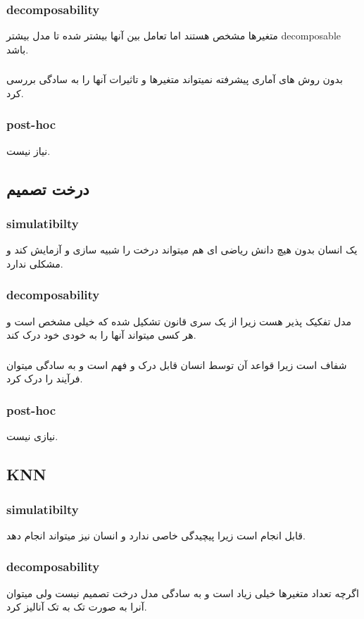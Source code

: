 \documentclass{article}[12pt]
\begin{document}
\subsubsection{decomposability}
متغیرها مشخص هستند اما تعامل بین آنها بیشتر شده تا مدل بیشتر decomposable باشد. 
\subsubsection{}
بدون روش های آماری پیشرفته نمیتواند متغیرها و تاثیرات آنها را به سادگی بررسی کرد.
\subsubsection{post-hoc}
نیاز نیست. 
\subsection{درخت تصمیم}
\subsubsection{simulatibilty}
یک انسان بدون 
هیچ دانش ریاضی ای هم میتواند درخت را شبیه سازی و آزمایش کند و مشکلی ندارد. 
\subsubsection{decomposability}
مدل تفکیک پذیر هست زیرا از یک سری قانون تشکیل شده که خیلی مشخص است و هر کسی میتواند آنها را به خودی خود درک کند.
\subsubsection{}
شفاف است زیرا قواعد آن توسط انسان قابل درک و فهم است و به سادگی میتوان فرآیند را درک کرد. 
\subsubsection{post-hoc}
نیازی نیست. 
\subsection{KNN}
\subsubsection{simulatibilty}
قابل انجام است زیرا پیچیدگی خاصی ندارد و انسان نیز میتواند انجام دهد.
\subsubsection{decomposability}
اگرچه تعداد متغیرها خیلی زیاد است و به سادگی مدل درخت تصمیم نیست ولی میتوان آنرا به صورت تک به تک آنالیز کرد. 
\end{document}
